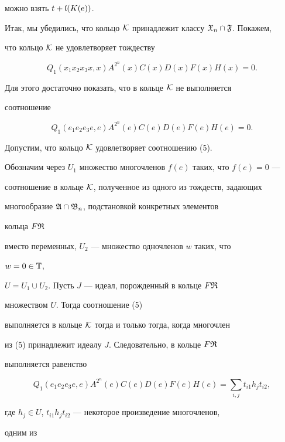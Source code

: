 можно взять $t+\frak l(K(e))$. 


 


Итак, мы убедились, что кольцо $\cal K$ принадлежит классу $\frak 


X_n\cap\frak F$. Покажем,  


что кольцо $\cal K$ не удовлетворяет тождеству 


$$ 


Q_1(x_1x_2x_3x,x)A^{2^n}(x)C(x)D(x)F(x)H(x)=0. 


$$ 


Для этого достаточно показать, что в кольце $\cal K$ не выполняется 


соотношение 


\begin{equation} 


Q_1(e_1e_2e_3e,e)A^{2^n}(e)C(e)D(e)F(e)H(e)=0. 


\end{equation}  


Допустим, что кольцо $\cal K$ удовлетворяет соотношению (5).


Обозначим через $U_1$ множество многочленов $f(e)$ таких, что $f(e)=0$ --- 


соотношение в кольце $\cal K$, полученное из одного из тождеств, задающих  


многообразие $\frak A\cap\frak B_n$, подстановкой конкретных элементов 


кольца $F\frak R$ 


вместо переменных, $U_2$ --- множество одночленов $w$ таких, что 


$w=0\in\Bbb T$, 


$U=U_1\cup U_2$. Пусть $J$ --- идеал, порожденный в кольце $F\frak R$ 


множеством  $U$. Тогда соотношение (5)


выполняется в кольце $\cal K$ тогда и только тогда, когда многочлен  


из (5) принадлежит идеалу $J$. Следовательно, в кольце $F\frak R$


выполняется равенство 


$$ 


Q_1(e_1e_2e_3e,e)A^{2^n}(e)C(e)D(e)F(e)H(e)=\sum_{i,j}t_{i1} 


h_j t_{i2}, 


$$ 


где $h_j\in U$, $t_{i1}h_j t_{i2}$ --- некоторое произведение многочленов, 


одним из  


